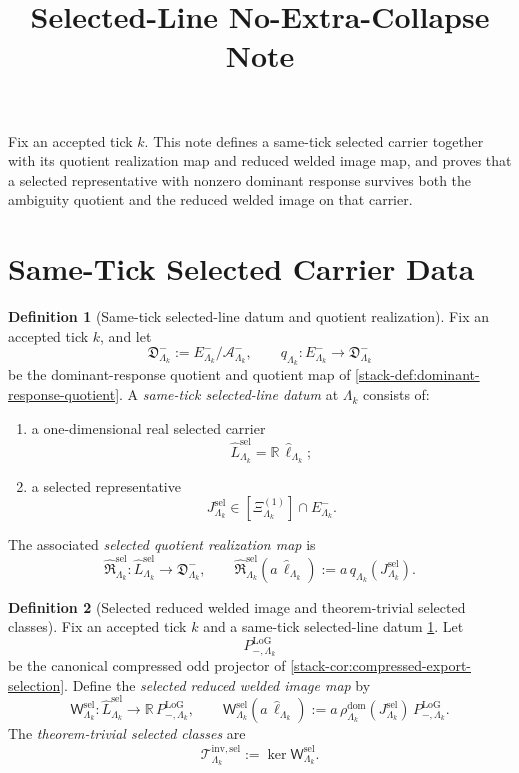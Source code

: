 \documentclass[11pt]{article}
\title{Selected-Line No-Extra-Collapse Note}
\author{}
\date{}
\theoremstyle{definition}
\newtheorem{definition}{Definition}[section]
\theoremstyle{plain}
\theoremstyle{remark}
\begin{document}
\maketitle

Fix an accepted tick \(k\).
This note defines a same-tick selected carrier together with its quotient realization map and
reduced welded image map, and proves that a selected representative with nonzero dominant response
survives both the ambiguity quotient and the reduced welded image on that carrier.

\section{Same-Tick Selected Carrier Data}

\begin{definition}[Same-tick selected-line datum and quotient realization]
\label{def:uom-selected-line-data}
Fix an accepted tick \(k\), and let
\[
\mathfrak D^-_{\Lambda_k}
:=
E^-_{\Lambda_k}/\mathcal A^-_{\Lambda_k},
\qquad
q_{\Lambda_k}:E^-_{\Lambda_k}\to\mathfrak D^-_{\Lambda_k}
\]
be the dominant-response quotient and quotient map of
\cref{stack-def:dominant-response-quotient}.
A \emph{same-tick selected-line datum} at \(\Lambda_k\) consists of:
\begin{enumerate}[leftmargin=2em,label=(\alph*)]
\item a one-dimensional real selected carrier
  \[
  \widehat L^{\mathrm{sel}}_{\Lambda_k}
  =
  \mathbb R\,\widehat\ell_{\Lambda_k};
  \]
\item a selected representative
  \[
  J^{\mathrm{sel}}_{\Lambda_k}\in[\Xi^{(1)}_{\Lambda_k}]\cap E^-_{\Lambda_k}.
  \]
\end{enumerate}
The associated \emph{selected quotient realization map} is
\[
\widehat{\mathfrak R}^{\mathrm{sel}}_{\Lambda_k}
:
\widehat L^{\mathrm{sel}}_{\Lambda_k}\longrightarrow \mathfrak D^-_{\Lambda_k},
\qquad
\widehat{\mathfrak R}^{\mathrm{sel}}_{\Lambda_k}(a\,\widehat\ell_{\Lambda_k})
:=
a\,q_{\Lambda_k}(J^{\mathrm{sel}}_{\Lambda_k}).
\]
\end{definition}

\begin{definition}[Selected reduced welded image and theorem-trivial selected classes]
\label{def:uom-selected-line-trivial}
Fix an accepted tick \(k\) and a same-tick selected-line datum
\cref{def:uom-selected-line-data}.
Let
\[
P_{-,\Lambda_k}^{\mathrm{LoG}}
\]
be the canonical compressed odd projector of
\cref{stack-cor:compressed-export-selection}.
Define the \emph{selected reduced welded image map} by
\[
\mathsf W^{\mathrm{sel}}_{\Lambda_k}
:
\widehat L^{\mathrm{sel}}_{\Lambda_k}\longrightarrow
\mathbb R\,P_{-,\Lambda_k}^{\mathrm{LoG}},
\qquad
\mathsf W^{\mathrm{sel}}_{\Lambda_k}(a\,\widehat\ell_{\Lambda_k})
:=
a\,\rho^{\mathrm{dom}}_{\Lambda_k}(J^{\mathrm{sel}}_{\Lambda_k})\,P_{-,\Lambda_k}^{\mathrm{LoG}}.
\]
The \emph{theorem-trivial selected classes} are
\[
\mathcal T^{\mathrm{inv,sel}}_{\Lambda_k}
:=
\ker\mathsf W^{\mathrm{sel}}_{\Lambda_k}.
\]
\end{definition}
\end{document}
